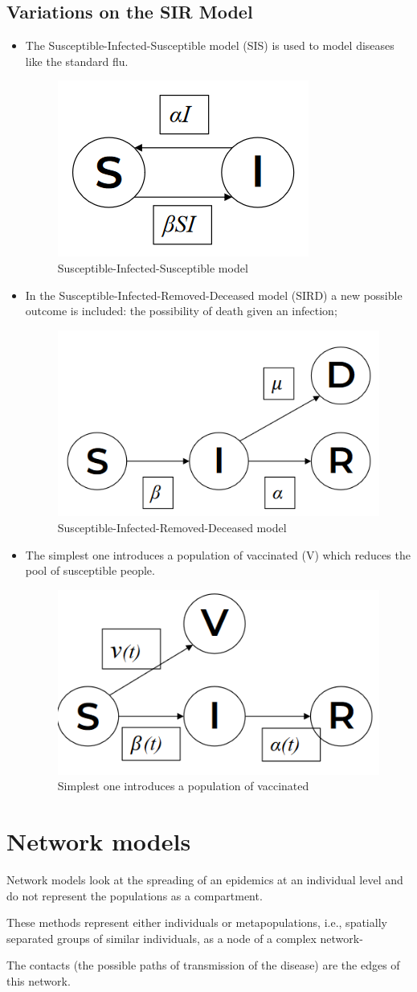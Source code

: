 \subsection{Variations on the SIR Model}
\begin{itemize}
    \item The Susceptible-Infected-Susceptible model (SIS) is used to 
        model diseases like the standard flu.
        \begin{figure}[!ht]
            \centering
            \includegraphics[width=0.25\linewidth]{img/SIS.png}
            \caption{Susceptible-Infected-Susceptible model}
            \label{fig:SIS}
        \end{figure}
    \item In the Susceptible-Infected-Removed-Deceased model (SIRD) a 
        new possible outcome is included: the possibility of death given an infection;
       \begin{figure}[!ht]
            \centering
            \includegraphics[width=0.25\linewidth]{img/SIRD.png}
            \caption{Susceptible-Infected-Removed-Deceased model}
            \label{fig:SIRD}
        \end{figure}
   \item The simplest one introduces a population of vaccinated (V) which           reduces the pool of susceptible people.
        \begin{figure}[!ht]
            \centering
            \includegraphics[width=0.25\linewidth]{img/SIRV1.png}
            \caption{Simplest one introduces a population of vaccinated}
            \label{fig:SIRV1}
        \end{figure}
\end{itemize}
\section{Network models}
Network models look at the spreading of an epidemics at an individual 
level and do not represent the populations as a compartment.

These methods represent either individuals or metapopulations, i.e., 
spatially separated groups of similar individuals, as a node of a complex 
network-

The contacts (the possible paths of transmission of the disease) are the 
edges of this network.